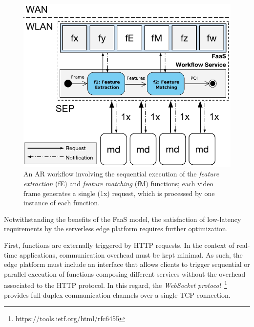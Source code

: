 \documentclass[letterpaper, 10 pt, conference]{ieeeconf}  %
\begin{document}

\begin{figure}[tbp]
	\centering
	\includegraphics[width=\linewidth]{Figs/Mobile_Computation_Offloading_Workflow.pdf}
	\caption{An AR workflow involving the sequential execution of the \textit{feature extraction} (fE) and \textit{feature matching} (fM) functions; each video frame generates a single (1x) request, which is processed by one instance of each function.} 
	\label{fig:Mobile_Computation_Offloading_Workflow}
\end{figure}

Notwithstanding the benefits of the FaaS model, the satisfaction of low-latency requirements by the serverless edge platform requires further optimization.

First, functions are externally triggered by HTTP requests. In the context of real-time applications, communication overhead must be kept minimal. As such, the edge platform must include an interface that allows clients to trigger sequential or parallel execution of functions composing different services without the overhead associated to the HTTP protocol. In this regard, the \textit{WebSocket protocol}~\footnote{https://tools.ietf.org/html/rfc6455}
provides full-duplex communication channels over a single TCP connection. %

\end{document}
